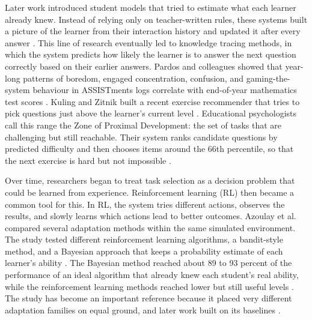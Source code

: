 Later work introduced student models that tried to estimate what each learner already knew. Instead of relying only on teacher-written rules, these systems built a picture of the learner from their interaction history and updated it after every answer \cite{zerkouk_comprehensive_2025}. This line of research eventually led to knowledge tracing methods, in which the system predicts how likely the learner is to answer the next question correctly based on their earlier answers. Pardos and colleagues showed that year-long patterns of boredom, engaged concentration, confusion, and gaming-the-system behaviour in ASSISTments logs correlate with end-of-year mathematics test scores \cite{Pardos2014AffectiveStatesStateTests}. Kuling and Zitnik built a recent exercise recommender that tries to pick questions just above the learner's current level \cite{kuling_ken_2025}. Educational psychologists call this range the Zone of Proximal Development: the set of tasks that are challenging but still reachable. Their system ranks candidate questions by predicted difficulty and then chooses items around the 66th percentile, so that the next exercise is hard but not impossible \cite{kuling_ken_2025}.

Over time, researchers began to treat task selection as a decision problem that could be learned from experience. Reinforcement learning (RL) then became a common tool for this. In RL, the system tries different actions, observes the results, and slowly learns which actions lead to better outcomes. Azoulay et al. compared several adaptation methods within the same simulated environment. The study tested different reinforcement learning algorithms, a bandit-style method, and a Bayesian approach that keeps a probability estimate of each learner's ability \cite{azoulay_adaptive_2021}. The Bayesian method reached about 89 to 93 percent of the performance of an ideal algorithm that already knew each student's real ability, while the reinforcement learning methods reached lower but still useful levels \cite{azoulay_adaptive_2021}. The study has become an important reference because it placed very different adaptation families on equal ground, and later work built on its baselines \cite{perez_emotions_2024}.

